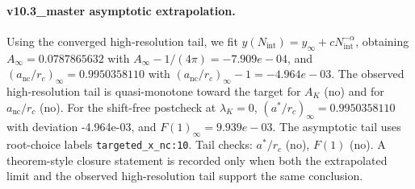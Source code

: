 \paragraph{v10.3_master asymptotic extrapolation.}
Using the converged high-resolution tail, we fit $y(N_{\mathrm{int}})=y_{\infty}+cN_{\mathrm{int}}^{-\alpha}$, obtaining $A_\infty=0.0787865632$ with $A_\infty-1/(4\pi)=-7.909e-04$, and $(a_{\mathrm{nc}}/r_c)_\infty=0.9950358110$ with $(a_{\mathrm{nc}}/r_c)_\infty-1=-4.964e-03$. The observed high-resolution tail is quasi-monotone toward the target for $A_K$ (no) and for $a_{\mathrm{nc}}/r_c$ (no). For the shift-free postcheck at $\lambda_K=0$, $(a^*/r_c)_\infty=0.9950358110$ with deviation -4.964e-03, and $F(1)_\infty=9.939e-03$. The asymptotic tail uses root-choice labels \texttt{targeted_x_nc:10}. Tail checks: $a^*/r_c$ (no), $F(1)$ (no). A theorem-style closure statement is recorded only when both the extrapolated limit and the
observed high-resolution tail support the same conclusion.
